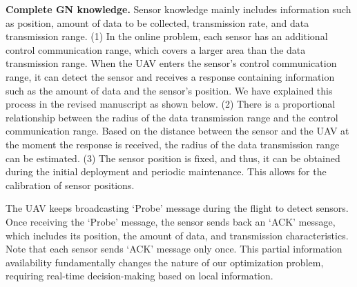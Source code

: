 \begin{revresponse}
	\textbf{Complete GN knowledge.}
	Sensor knowledge mainly includes information such as position, amount of data to be collected, transmission rate, and data transmission range.
	(1) In the online problem, each sensor has an additional control communication range, which covers a larger area than the data transmission range.
	When the UAV enters the sensor's control communication range, it can detect the sensor and receives a response containing information such as the amount of data and the sensor's position.
	We have explained this process in the revised manuscript as shown below.
	(2) There is a proportional relationship between the radius of the data transmission range and the control communication range.
	Based on the distance between the sensor and the UAV at the moment the response is received, the radius of the data transmission range can be estimated.
	(3) The sensor position is fixed, and thus, it can be obtained during the initial deployment and periodic maintenance. This allows for the calibration of sensor positions.
	\begin{changes}
		The UAV keeps broadcasting `Probe' message during the flight to detect sensors. Once receiving the `Probe' message, the sensor sends back an `ACK' message, which includes its position, the amount of data, and transmission characteristics. Note that each sensor sends `ACK' message only once. This partial information availability fundamentally changes the nature of our optimization problem, requiring real-time 
		decision-making based on local information.
	\end{changes}
\end{revresponse}

